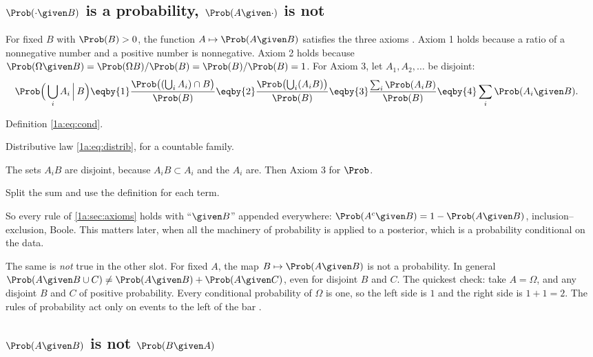 \subsection{$\Prob(\cdot\given B)$ is a probability, $\Prob(A\given\cdot)$ is not}

For fixed $B$ with $\Prob(B)>0$, the function $A\mapsto\Prob(A\given B)$ satisfies the
three axioms . Axiom 1 holds because a ratio of a
nonnegative number and a positive number is nonnegative. Axiom 2 holds because
$\Prob(\Omega\given B)=\Prob(\Omega B)/\Prob(B)=\Prob(B)/\Prob(B)=1$. For Axiom 3, let
$A_1,A_2,\dots$ be disjoint:
\begin{align*}
\Prob\Bigl(\,\bigcup_iA_i\,\Big\vert\, B\Bigr)
&\eqby{1}\frac{\Prob\bigl((\bigcup_iA_i)\cap B\bigr)}{\Prob(B)}
 \eqby{2}\frac{\Prob\bigl(\bigcup_i(A_iB)\bigr)}{\Prob(B)}
 \eqby{3}\frac{\sum_i\Prob(A_iB)}{\Prob(B)}
 \eqby{4}\sum_i\Prob(A_i\given B).
\end{align*}
\begin{explain}
  \item Definition \eqref{1a:eq:cond}.
  \item Distributive law \eqref{1a:eq:distrib}, for a countable family.
  \item The sets $A_iB$ are disjoint, because $A_iB\subset A_i$ and the $A_i$
        are. Then Axiom 3 for $\Prob$.
  \item Split the sum and use the definition for each term.
\end{explain}
So every rule of \cref{1a:sec:axioms} holds with ``$\given B$'' appended
everywhere: $\Prob(A^c\given B)=1-\Prob(A\given B)$, inclusion--exclusion, Boole.
This matters later, when all the machinery of probability is applied to a
posterior, which is a probability conditional on the data.

The same is \emph{not} true in the other slot. For fixed $A$, the map
$B\mapsto\Prob(A\given B)$ is not a probability. In general
$\Prob(A\given B\cup C)\neq\Prob(A\given B)+\Prob(A\given C)$, even for disjoint $B$ and
$C$. The quickest check: take $A=\Omega$, and any disjoint $B$ and $C$ of positive
probability. Every conditional probability of $\Omega$ is one, so the left side
is $1$ and the right side is $1+1=2$. The rules of probability act only on
events to the left of the bar .

\subsection{$\Prob(A\given B)$ is not $\Prob(B\given A)$}

